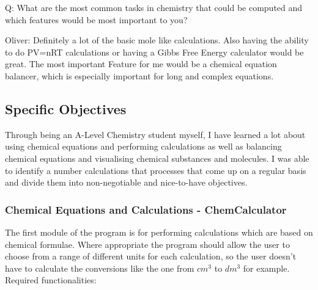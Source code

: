 \documentclass[a4paper,12pt]{article}
\begin{document}
\newpage
Q: What are the most common tasks in chemistry that could be computed and which features would be most important to you?\\
\linebreak

Oliver: Definitely a lot of the basic mole like calculations. Also having the ability to do PV=nRT calculations or having a Gibbs Free Energy calculator would be great. The most important Feature for me would be a chemical equation balancer, which is especially important for long and complex equations.


\subsection{Specific Objectives}

Through being an A-Level Chemistry student myself, I have learned a lot about using chemical equations and performing calculations as well as balancing chemical equations and visualising chemical substances and molecules. I was able to identify a number calculations that processes that come up on a regular basis and divide them into non-negotiable and nice-to-have objectives.

\subsubsection{Chemical Equations and Calculations - ChemCalculator}

The first module of the program is for performing  calculations which are based on chemical formulae.
Where appropriate the program should allow the user to choose from a range of different units for each calculation, so the user doesn't have to calculate the conversions like the one from $cm^{3}$ to $dm^{3}$ for example.\\
\linebreak
Required functionalities:\\
\linebreak
\end{document}
